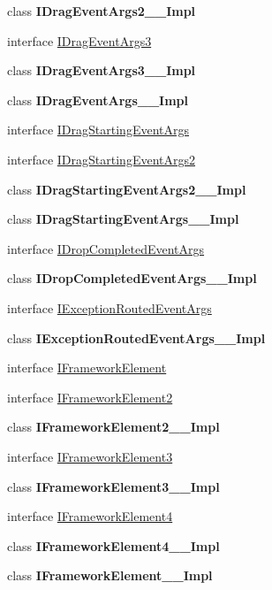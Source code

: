 \begin{DoxyCompactItemize}
\item 
class {\bfseries I\+Drag\+Event\+Args2\+\_\+\+\_\+\+Impl}
\item 
interface \hyperlink{interface_windows_1_1_u_i_1_1_xaml_1_1_i_drag_event_args3}{I\+Drag\+Event\+Args3}
\item 
class {\bfseries I\+Drag\+Event\+Args3\+\_\+\+\_\+\+Impl}
\item 
class {\bfseries I\+Drag\+Event\+Args\+\_\+\+\_\+\+Impl}
\item 
interface \hyperlink{interface_windows_1_1_u_i_1_1_xaml_1_1_i_drag_starting_event_args}{I\+Drag\+Starting\+Event\+Args}
\item 
interface \hyperlink{interface_windows_1_1_u_i_1_1_xaml_1_1_i_drag_starting_event_args2}{I\+Drag\+Starting\+Event\+Args2}
\item 
class {\bfseries I\+Drag\+Starting\+Event\+Args2\+\_\+\+\_\+\+Impl}
\item 
class {\bfseries I\+Drag\+Starting\+Event\+Args\+\_\+\+\_\+\+Impl}
\item 
interface \hyperlink{interface_windows_1_1_u_i_1_1_xaml_1_1_i_drop_completed_event_args}{I\+Drop\+Completed\+Event\+Args}
\item 
class {\bfseries I\+Drop\+Completed\+Event\+Args\+\_\+\+\_\+\+Impl}
\item 
interface \hyperlink{interface_windows_1_1_u_i_1_1_xaml_1_1_i_exception_routed_event_args}{I\+Exception\+Routed\+Event\+Args}
\item 
class {\bfseries I\+Exception\+Routed\+Event\+Args\+\_\+\+\_\+\+Impl}
\item 
interface \hyperlink{interface_windows_1_1_u_i_1_1_xaml_1_1_i_framework_element}{I\+Framework\+Element}
\item 
interface \hyperlink{interface_windows_1_1_u_i_1_1_xaml_1_1_i_framework_element2}{I\+Framework\+Element2}
\item 
class {\bfseries I\+Framework\+Element2\+\_\+\+\_\+\+Impl}
\item 
interface \hyperlink{interface_windows_1_1_u_i_1_1_xaml_1_1_i_framework_element3}{I\+Framework\+Element3}
\item 
class {\bfseries I\+Framework\+Element3\+\_\+\+\_\+\+Impl}
\item 
interface \hyperlink{interface_windows_1_1_u_i_1_1_xaml_1_1_i_framework_element4}{I\+Framework\+Element4}
\item 
class {\bfseries I\+Framework\+Element4\+\_\+\+\_\+\+Impl}
\item 
class {\bfseries I\+Framework\+Element\+\_\+\+\_\+\+Impl}

\end{DoxyCompactItemize}
